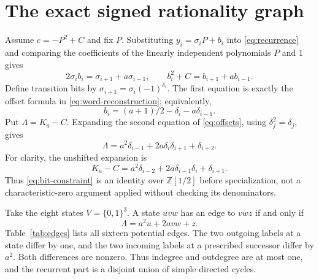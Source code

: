 \section{The exact signed rationality graph}\label{sec:graph}
Assume $c=-P^2+C$ and fix $P$. Substituting
$y_i=\sigma_iP+b_i$ into \eqref{eq:recurrence} and comparing the
coefficients of the linearly independent polynomials $P$ and $1$ gives
\begin{equation}\label{eq:offsets}
 2\sigma_i b_i=\sigma_{i+1}+a\sigma_{i-1},\qquad
 b_i^2+C=b_{i+1}+a b_{i-1}.
\end{equation}
Define transition bits by $\sigma_{i+1}=\sigma_i(-1)^{\delta_i}$.
The first equation is exactly the offset formula in
\eqref{eq:word-reconstruction}; equivalently,
\begin{equation}\label{eq:offset-bits}
 b_i=(a+1)/2-\delta_i-a\delta_{i-1}.
\end{equation}
Put $\Lambda=K_a-C$. Expanding the second equation of
\eqref{eq:offsets}, using $\delta_j^2=\delta_j$, gives
\begin{equation}\label{eq:bit-constraint}
 \Lambda=a^2\delta_{i-1}+2a\delta_i\delta_{i+1}+\delta_{i+2}.
\end{equation}
For clarity, the unshifted expansion is
\[
 K_a-C=a^2\delta_{i-2}+2a\delta_{i-1}\delta_i+\delta_{i+1}.
\]
Thus \eqref{eq:bit-constraint} is an identity over
$\mathbb Z[1/2]$ before specialization, not a characteristic-zero
argument applied without checking its denominators.

Take the eight states $V=\{0,1\}^3$. A state $uvw$ has an edge
to $vwz$ if and only if
\begin{equation}\label{eq:edge}
 \Lambda=a^2u+2avw+z.
\end{equation}
Table~\ref{tab:edges} lists all sixteen potential edges. The two
outgoing labels at a state differ by one, and the two incoming labels
at a prescribed successor differ by $a^2$. Both differences are
nonzero. Thus indegree and outdegree are at most one, and the recurrent
part is a disjoint union of simple directed cycles.

